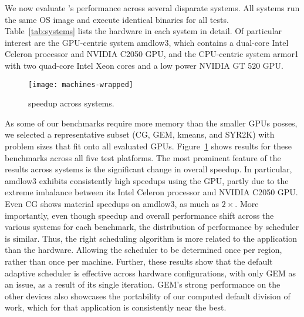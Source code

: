 We now evaluate \tsar's performance across several disparate systems. All
systems run the same OS image and execute identical binaries for all tests.
Table~\ref{tab:systems} lists the hardware in each system in detail. Of
particular interest are the GPU-centric system amdlow3, which contains a
dual-core Intel Celeron processor and NVIDIA C2050 GPU, and the CPU-centric
system armor1 with two quad-core Intel Xeon cores and a low power NVIDIA GT
520 GPU.

\begin{figure}[t]
        \texttt{[image: machines-wrapped]}
        \caption{\tsar speedup across systems.\label{fig:nodes}}
\end{figure}

As some of our benchmarks require more memory than the smaller GPUs posses, we
selected a representative subset (CG, GEM, kmeans, and SYR2K) with problem
sizes that fit onto all evaluated GPUs.  Figure~\ref{fig:nodes} shows results
for these benchmarks across all five test platforms.  The most prominent
feature of the results across systems is the significant change in overall
speedup. In particular, amdlow3 exhibits consistently high speedups using the
GPU, partly due to the extreme imbalance between its Intel Celeron processor
and NVIDIA C2050 GPU. Even CG shows material speedups on amdlow3, as much as
$2 \times$. More importantly, even though speedup and overall performance
shift across the various systems for each benchmark, the distribution of
performance by scheduler is similar.  Thus, the right \tsar scheduling
algorithm is more related to the application than the hardware.  Allowing the
scheduler to be determined once per region, rather than once per machine.
Further, these results show that the default adaptive scheduler is effective
across hardware configurations, with only GEM as an issue, as a result of its
single iteration. GEM's strong performance on the other devices also showcases
the portability of our computed default division of work, which for that
application is consistently near the best.

